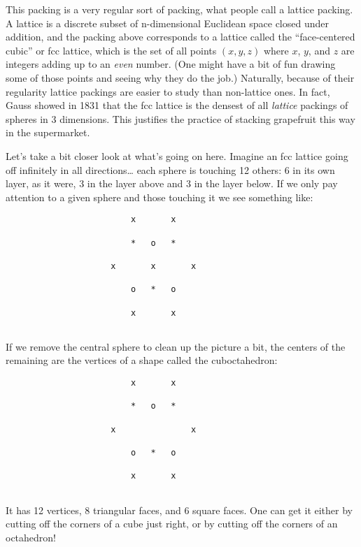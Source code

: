 \documentclass{article}
\begin{document}
This packing is a very regular sort of packing, what people call a
lattice packing. A lattice is a discrete subset of n-dimensional
Euclidean space closed under addition, and the packing above corresponds
to a lattice called the ``face-centered cubic'' or fcc lattice, which is
the set of all points \((x,y,z)\) where \(x\), \(y\), and \(z\) are
integers adding up to an \emph{even} number. (One might have a bit of
fun drawing some of those points and seeing why they do the job.)
Naturally, because of their regularity lattice packings are easier to
study than non-lattice ones. In fact, Gauss showed in 1831 that the fcc
lattice is the densest of all \emph{lattice} packings of spheres in 3
dimensions. This justifies the practice of stacking grapefruit this way
in the supermarket.

Let's take a bit closer look at what's going on here. Imagine an fcc
lattice going off infinitely in all directions\ldots{} each sphere is
touching 12 others: 6 in its own layer, as it were, 3 in the layer above
and 3 in the layer below. If we only pay attention to a given sphere and
those touching it we see something like:

\begin{verbatim}
                         x       x   

                         *   o   * 
 
                     x       x       x

                         o   *   o

                         x       x
                         
\end{verbatim}

If we remove the central sphere to clean up the picture a bit, the
centers of the remaining are the vertices of a shape called the
cuboctahedron:

\begin{verbatim}
                         x       x   

                         *   o   * 
 
                     x               x

                         o   *   o

                         x       x
                         
\end{verbatim}

It has 12 vertices, 8 triangular faces, and 6 square faces. One can get
it either by cutting off the corners of a cube just right, or by cutting
off the corners of an octahedron!
\end{document}
